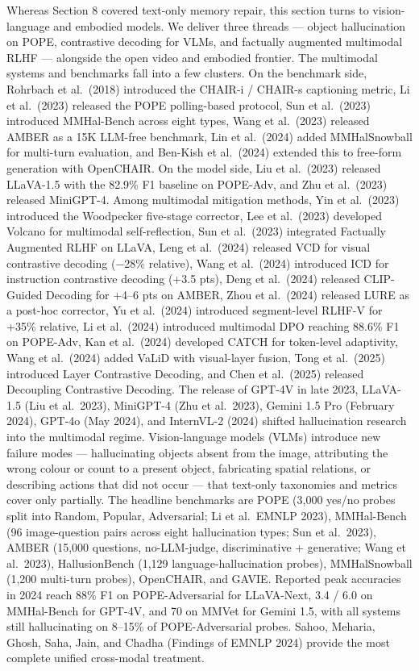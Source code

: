 Whereas Section 8 covered text-only memory repair, this section turns to vision-language and embodied models. We deliver three threads --- object hallucination on POPE, contrastive decoding for VLMs, and factually augmented multimodal RLHF --- alongside the open video and embodied frontier. The multimodal systems and benchmarks fall into a few clusters. On the benchmark side, Rohrbach et al.~(2018) introduced the CHAIR-i / CHAIR-s captioning metric, Li et al.~(2023) released the POPE polling-based protocol, Sun et al.~(2023) introduced MMHal-Bench across eight types, Wang et al.~(2023) released AMBER as a 15K LLM-free benchmark, Lin et al.~(2024) added MMHalSnowball for multi-turn evaluation, and Ben-Kish et al.~(2024) extended this to free-form generation with OpenCHAIR. On the model side, Liu et al.~(2023) released LLaVA-1.5 with the 82.9\% F1 baseline on POPE-Adv, and Zhu et al.~(2023) released MiniGPT-4. Among multimodal mitigation methods, Yin et al.~(2023) introduced the Woodpecker five-stage corrector, Lee et al.~(2023) developed Volcano for multimodal self-reflection, Sun et al.~(2023) integrated Factually Augmented RLHF on LLaVA, Leng et al.~(2024) released VCD for visual contrastive decoding (−28\% relative), Wang et al.~(2024) introduced ICD for instruction contrastive decoding (+3.5 pts), Deng et al.~(2024) released CLIP-Guided Decoding for +4--6 pts on AMBER, Zhou et al.~(2024) released LURE as a post-hoc corrector, Yu et al.~(2024) introduced segment-level RLHF-V for +35\% relative, Li et al.~(2024) introduced multimodal DPO reaching 88.6\% F1 on POPE-Adv, Kan et al.~(2024) developed CATCH for token-level adaptivity, Wang et al.~(2024) added VaLiD with visual-layer fusion, Tong et al.~(2025) introduced Layer Contrastive Decoding, and Chen et al.~(2025) released Decoupling Contrastive Decoding. The release of GPT-4V in late 2023, LLaVA-1.5 (Liu et al.~2023), MiniGPT-4 (Zhu et al.~2023), Gemini 1.5 Pro (February 2024), GPT-4o (May 2024), and InternVL-2 (2024) shifted hallucination research into the multimodal regime. Vision-language models (VLMs) introduce new failure modes --- hallucinating objects absent from the image, attributing the wrong colour or count to a present object, fabricating spatial relations, or describing actions that did not occur --- that text-only taxonomies and metrics cover only partially. The headline benchmarks are POPE (3,000 yes/no probes split into Random, Popular, Adversarial; Li et al.~EMNLP 2023), MMHal-Bench (96 image-question pairs across eight hallucination types; Sun et al.~2023), AMBER (15,000 questions, no-LLM-judge, discriminative + generative; Wang et al.~2023), HallusionBench (1,129 language-hallucination probes), MMHalSnowball (1,200 multi-turn probes), OpenCHAIR, and GAVIE. Reported peak accuracies in 2024 reach 88\% F1 on POPE-Adversarial for LLaVA-Next, 3.4 / 6.0 on MMHal-Bench for GPT-4V, and 70 on MMVet for Gemini 1.5, with all systems still hallucinating on 8--15\% of POPE-Adversarial probes. Sahoo, Meharia, Ghosh, Saha, Jain, and Chadha (Findings of EMNLP 2024) provide the most complete unified cross-modal treatment.

